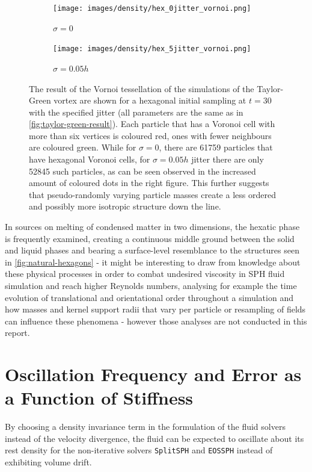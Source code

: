 \begin{figure}
  \begin{subfigure}[t]{0.49\textwidth}
    \texttt{[image: images/density/hex\_0jitter\_vornoi.png]}
    \caption{$\sigma=0$}
  \end{subfigure}
  \begin{subfigure}[t]{0.49\textwidth}
    \texttt{[image: images/density/hex\_5jitter\_vornoi.png]}
    \caption{$\sigma=0.05h$}
  \end{subfigure}
  \caption{The result of the Vornoi tessellation of the simulations of the Taylor-Green vortex are shown for a hexagonal initial sampling at $t=30$ with the specified jitter (all parameters are the same as in \autoref{fig:taylor-green-result}). Each particle that has a Voronoi cell with more than six vertices is coloured red, ones with fewer neighbours are coloured green. While for  $\sigma=0$, there are 61759 particles that have hexagonal Voronoi cells, for $\sigma=0.05h$ jitter there are only 52845 such particles, as can be seen observed in the increased amount of coloured dots in the right figure. This further suggests that pseudo-randomly varying particle masses create a less ordered and possibly more isotropic structure down the line.}
  \label{fig:jitter-vornoi-tesselation}
\end{figure}

In sources on melting of condensed matter in two dimensions, the hexatic phase is frequently examined, creating a continuous middle ground between the solid and liquid phases and bearing a surface-level resemblance to the structures seen in \autoref{fig:natural-hexagons} - it might be interesting to draw from knowledge about these physical processes in order to combat undesired viscosity in SPH fluid simulation and reach higher Reynolds numbers, analysing for example the time evolution of translational and orientational order throughout a simulation and how masses and kernel support radii that vary per particle or resampling of fields can influence these phenomena - however those analyses are not conducted in this report.


\newpage
\section{Oscillation Frequency and Error as a Function of Stiffness}\label{sec:oscillations}
By choosing a density invariance term in the formulation of the fluid solvers instead of the velocity divergence, the fluid can be expected to oscillate about its rest density for the non-iterative solvers \texttt{SplitSPH} and \texttt{EOSSPH} instead of exhibiting volume drift.


